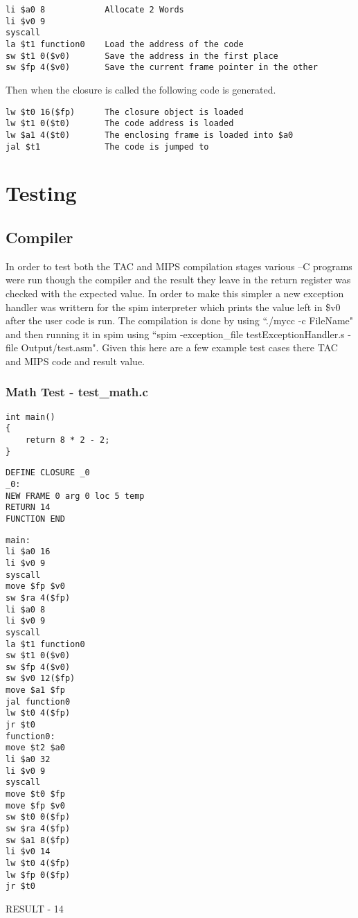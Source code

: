 \documentclass{article}
\begin{document}
\begin{lstlisting}
li $a0 8            Allocate 2 Words
li $v0 9
syscall
la $t1 function0    Load the address of the code
sw $t1 0($v0)       Save the address in the first place
sw $fp 4($v0)       Save the current frame pointer in the other
\end{lstlisting}

Then when the closure is called the following code is generated.

\begin{lstlisting}
lw $t0 16($fp)      The closure object is loaded
lw $t1 0($t0)       The code address is loaded
lw $a1 4($t0)       The enclosing frame is loaded into $a0
jal $t1             The code is jumped to
\end{lstlisting}

\section{Testing}

\subsection{Compiler}
In order to test both the TAC and MIPS compilation stages various --C programs
were run though the compiler and the result they leave in the return register
was checked with the expected value. In order to make this simpler a new
exception handler was writtern for the spim interpreter which prints the value
left in \$v0 after the user code is run. The compilation is done by using
``./mycc -c FileName" and then running it in spim using ``spim -exception\_file testExceptionHandler.s -file Output/test.asm".
Given this here are a few example test cases there TAC and MIPS code and result
value.

\subsubsection{Math Test - test\_math.c}
\begin{lstlisting}
int main()
{
    return 8 * 2 - 2;
}
\end{lstlisting}
\begin{lstlisting}
DEFINE CLOSURE _0
_0:
NEW FRAME 0 arg 0 loc 5 temp
RETURN 14
FUNCTION END
\end{lstlisting}
\begin{lstlisting}
main:
li $a0 16
li $v0 9
syscall
move $fp $v0
sw $ra 4($fp)
li $a0 8
li $v0 9
syscall
la $t1 function0
sw $t1 0($v0)
sw $fp 4($v0)
sw $v0 12($fp)
move $a1 $fp
jal function0
lw $t0 4($fp)
jr $t0
function0:
move $t2 $a0
li $a0 32
li $v0 9
syscall
move $t0 $fp
move $fp $v0
sw $t0 0($fp)
sw $ra 4($fp)
sw $a1 8($fp)
li $v0 14
lw $t0 4($fp)
lw $fp 0($fp)
jr $t0
\end{lstlisting}
RESULT - 14
\end{document}
